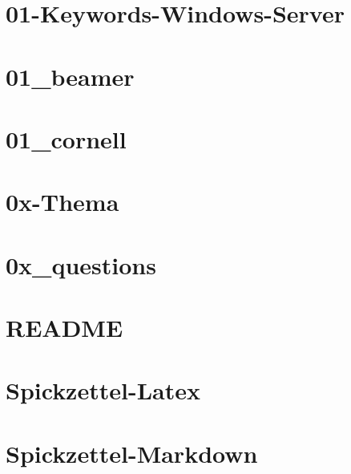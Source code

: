 



\chapter{01-Keywords-Windows-Server}
%
\chapter{01_beamer}
%
\chapter{01_cornell}
%
\chapter{0x-Thema}
%
\chapter{0x_questions}
%
\chapter{README}
%
\chapter{Spickzettel-Latex}
%
\chapter{Spickzettel-Markdown}
%



%
%

